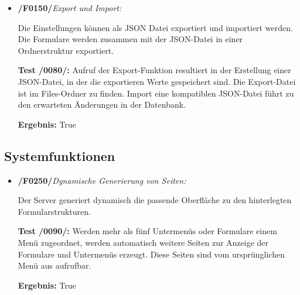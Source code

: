 \begin{itemize}
        \item \textbf{/F0150/}\textit{Export und Import:} \par
        Die Einstellungen können als JSON Datei exportiert und importiert werden. Die Formulare werden zusammen mit der JSON-Datei in einer Ordnerstruktur exportiert.\par
        \noindent \textbf{Test /0080/:} Aufruf der Export-Funktion resultiert in der Erstellung einer JSON-Datei, in der die exportieren Werte gespeichert sind. Die Export-Datei ist im Files-Ordner zu finden. Import eine kompatiblen JSON-Datei führt zu den erwarteten Änderungen in der Datenbank.\par
        \noindent \textbf{Ergebnis:} True
    \end{itemize}{}
  
  \vspace{1,5cm}  
  \subsection{Systemfunktionen}
  
    \begin{itemize}
        \item \textbf{/F0250/}\textit{Dynamische Generierung von Seiten:} \par
        Der Server generiert dynamisch die passende Oberfläche zu den hinterlegten Formularstrukturen.\par
        \noindent \textbf{Test /0090/:} Werden mehr als fünf Untermenüs oder Formulare einem Menü zugeordnet, werden automatisch weitere Seiten zur Anzeige der Formulare und Untermenüs erzeugt. Diese Seiten sind vom ursprünglichen Menü aus aufrufbar.\par
        \noindent \textbf{Ergebnis:} True
    \end{itemize}
